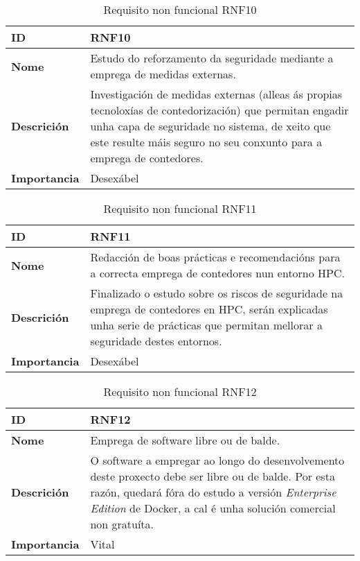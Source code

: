 \begin{table}[H]
\centering
\caption{Requisito non funcional RNF10}
\label{RNF10}
\begin{tabularx}{\textwidth}{|l|X|}
\hline
\textbf{ID} & RNF10 \\ \hline
\textbf{Nome} & Estudo do reforzamento da seguridade mediante a emprega de medidas externas. \\ \hline
\textbf{Descrición} & Investigación de medidas externas (alleas ás propias tecnoloxías de contedorización) que permitan engadir unha capa de seguridade no sistema, de xeito que este resulte máis seguro no seu conxunto para a emprega de contedores. \\ \hline
\textbf{Importancia} & Desexábel \\ \hline
\end{tabularx}
\end{table}

\begin{table}[H]
\centering
\caption{Requisito non funcional RNF11}
\label{RNF11}
\begin{tabularx}{\textwidth}{|l|X|}
\hline
\textbf{ID} & RNF11 \\ \hline
\textbf{Nome} & Redacción de boas prácticas e recomendacións para a correcta emprega de contedores nun entorno \gls{HPC}. \\ \hline
\textbf{Descrición} & Finalizado o estudo sobre os riscos de seguridade na emprega de contedores en \gls{HPC}, serán explicadas unha serie de prácticas que permitan mellorar a seguridade destes entornos. \\ \hline
\textbf{Importancia} & Desexábel \\ \hline
\end{tabularx}
\end{table}

\begin{table}[H]
\centering
\caption{Requisito non funcional RNF12}
\label{RNF12}
\begin{tabularx}{\textwidth}{|l|X|}
\hline
\textbf{ID} & RNF12 \\ \hline
\textbf{Nome} & Emprega de software libre ou de balde. \\ \hline
\textbf{Descrición} & O software a empregar ao longo do desenvolvemento deste proxecto debe ser libre ou de balde. Por esta razón, quedará fóra do estudo a versión \textit{Enterprise Edition} de Docker, a cal é unha solución comercial non gratuíta. \\ \hline
\textbf{Importancia} & Vital \\ \hline
\end{tabularx}
\end{table}
